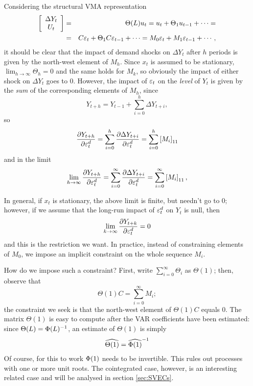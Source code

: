 \documentclass[a4paper,10pt]{article}
\newcommand{\PrE}[1]{\ensuremath u_{#1}} %
\newcommand{\StS}[1]{\ensuremath \varepsilon_{#1}} %
\newcommand{\VarSym}{\ensuremath \Phi}
\newcommand{\pder}[2]{\ensuremath\frac{\partial #1}{\partial #2}}
\begin{document}
Considering the structural VMA representation
\begin{eqnarray*}
  \left[ \begin{array}{c} \Delta Y_t \\ U_t \end{array}\right] & = & 
  \Theta(L) \PrE{t} =
  \PrE{t} + \Theta_1 \PrE{t-1}  + \cdots = \\
  & = & C \StS{t} + \Theta_1 C \StS{t-1}  + \cdots =
  M_0 \StS{t} + M_1 \StS{t-1}  + \cdots ,
\end{eqnarray*}
it should be clear that the impact of demand shocks on $\Delta Y_t$
after $h$ periods is given by the north-west element of $M_h$. Since
$x_t$ is assumed to be stationary, $\lim_{h \to \infty} \Theta_h = 0$
and the same holds for $M_k$, so obviously the impact of either shock
on $\Delta Y_t$ goes to 0. However, the impact of $\StS{t}$ on the  %
\emph{level} of $Y_t$ is given by the \emph{sum} of the corresponding
elements of $M_h$, since
\[
Y_{t+h} = Y_{t-1} + \sum_{i=0}^h \Delta Y_{t+i}, 
\]
so 
\[
  \pder{Y_{t+h}}{\StS{t}^d} = 
  \sum_{i=0}^h \pder{\Delta Y_{t+i}}{\StS{t}^d} = 
  \sum_{i=0}^h \left[M_i\right]_{11}
\]
and in the limit
\[
\lim_{h \to \infty} \pder{Y_{t+h}}{\StS{t}^d} = \sum_{i=0}^{\infty}
\pder{\Delta Y_{t+i}}{\StS{t}^d}  = 
  \sum_{i=0}^{\infty} \left[M_i\right]_{11},
\]

In general, if $x_t$ is stationary, the above limit is finite, but
needn't go to 0; however, if we assume that the long-run impact of
$\StS{t}^d$ on $Y_t$ is null, then
\[
  \lim_{k \to \infty} \pder{Y_{t+k}}{\StS{t}^d} = 0
\]
and this is the restriction we want. In practice, instead of
constraining elements of $M_0$, we impose an implicit constraint on
the whole sequence $M_i$.

How do we impose such a constraint?  First, write $\sum_{i=0}^{\infty}
\Theta_i$ as $\Theta(1)$; then, observe that
\[
  \Theta(1) C = \sum_{i=0}^{\infty} M_i ;
\]
the constraint we seek is that the north-west element of $\Theta(1) C$
equals 0. The matrix $\Theta(1)$ is easy to compute after the VAR
coefficients have been estimated: since $\Theta(L) = \VarSym(L)^{-1}$, an
estimate of $\Theta(1)$ is simply
\[
  \widehat{\Theta(1)} = \widehat{\VarSym(1)}^{-1}
\]
Of course, for this to work $\VarSym(1)$ needs to be invertible. This rules
out processes with one or more unit roots. The cointegrated case,
however, is an interesting related case and will be analysed in section
\ref{sec:SVECs}.
\end{document}
